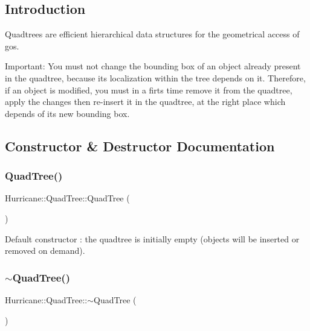\hypertarget{classHurricane_1_1QuadTree_secQuadTreeIntro}{}\subsection{Introduction}\label{classHurricane_1_1QuadTree_secQuadTreeIntro}
Quadtrees are efficient hierarchical data structures for the geometrical access of gos.

\begin{DoxyParagraph}{Important\+:}
You must not change the bounding box of an object already present in the quadtree, because its localization within the tree depends on it. Therefore, if an object is modified, you must in a firts time remove it from the quadtree, apply the changes then re-\/insert it in the quadtree, at the right place which depends of its new bounding box. 
\end{DoxyParagraph}


\subsection{Constructor \& Destructor Documentation}
\mbox{\label{classHurricane_1_1QuadTree_a91303ebe7740d87429c74205181ac702}} 
\subsubsection{\texorpdfstring{Quad\+Tree()}{QuadTree()}}
{\footnotesize\ttfamily Hurricane\+::\+Quad\+Tree\+::\+Quad\+Tree (\begin{DoxyParamCaption}{ }\end{DoxyParamCaption})}

Default constructor \+: the quadtree is initially empty (objects will be inserted or removed on demand). \mbox{\label{classHurricane_1_1QuadTree_a3f0c6d7849185a9881bdb3b022fe1777}} 
\subsubsection{\texorpdfstring{$\sim$\+Quad\+Tree()}{~QuadTree()}}
{\footnotesize\ttfamily Hurricane\+::\+Quad\+Tree\+::$\sim$\+Quad\+Tree (\begin{DoxyParamCaption}{ }\end{DoxyParamCaption})}

